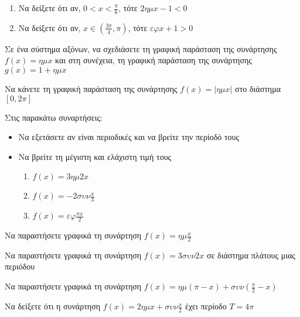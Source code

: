 \documentclass{../presentation}
\begin{document}
\begin{askisi}
  \begin{enumerate}
    \item<1-> Να δείξετε ότι αν, $0<x<\frac{π}{6}$, τότε $2ημx-1<0$
    \item<2-> Να δείξετε ότι αν, $x\in(\frac{3π}{4},π)$, τότε $εφx+1>0$
  \end{enumerate}
\end{askisi}

\begin{askisi}
  Σε ένα σύστημα αξόνων, να σχεδιάσετε τη γραφική παράσταση της συνάρτησης $f(x)=ημx$ και στη συνέχεια, τη γραφική παράσταση της συνάρτησης $g(x)=1+ημx$
\end{askisi}

\begin{askisi}
  Να κάνετε τη γραφική παράσταση της συνάρτησης $f(x)=|ημx|$ στο διάστημα $[0,2π]$
\end{askisi}

\begin{askisi}
  Στις παρακάτω συναρτήσεις:
  \begin{itemize}
    \item Να εξετάσετε αν είναι περιοδικές και να βρείτε την περίοδό τους
    \item Να βρείτε τη μέγιστη και ελάχιστη τιμή τους
          \begin{enumerate}
            \item<1-> $f(x)=3ημ2x$
            \item<2-> $f(x)=-2συν\frac{x}{3}$
            \item<3-> $f(x)=εφ\frac{πx}{2}$
          \end{enumerate}
  \end{itemize}
\end{askisi}

\begin{askisi}
  Να παραστήσετε γραφικά τη συνάρτηση $f(x)=ημ\frac{x}{2}$
\end{askisi}

\begin{askisi}
  Να παραστήσετε γραφικά τη συνάρτηση $f(x)=3συν2x$ σε διάστημα πλάτους μιας περιόδου
\end{askisi}

\begin{askisi}
  Να παραστήσετε γραφικά τη συνάρτηση $f(x)=ημ(π-x)+συν(\frac{π}{2}-x)$
\end{askisi}

\begin{askisi}
  Να δείξετε ότι η συνάρτηση $f(x)=2ημx+συν\frac{x}{2}$ έχει περίοδο $T=4π$
\end{askisi}
\end{document}
